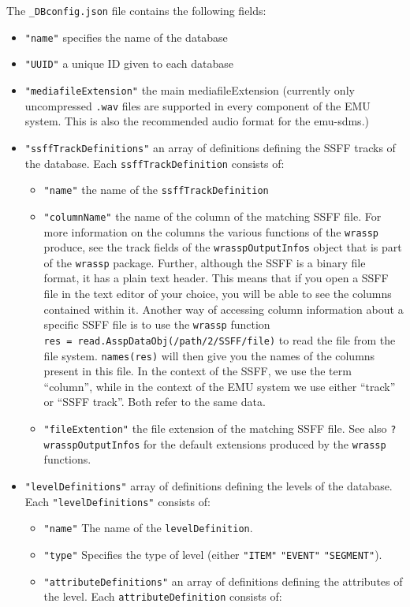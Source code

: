 \documentclass[]{book}
\begin{document}
The \texttt{\_DBconfig.json} file contains the following fields:

\begin{itemize}
\item
  \texttt{"name"} specifies the name of the database
\item
  \texttt{"UUID"} a unique ID given to each database
\item
  \texttt{"mediafileExtension"} the main mediafileExtension (currently only uncompressed \texttt{.wav} files are supported in every component of the EMU system. This is also the recommended audio format for the {emu-sdms}.)
\item
  \texttt{"ssffTrackDefinitions"} an array of definitions defining the SSFF tracks of the database. Each \texttt{ssffTrackDefinition} consists of:

  \begin{itemize}
  \item
    \texttt{"name"} the name of the \texttt{ssffTrackDefinition}
  \item
    \texttt{"columnName"} the name of the column of the matching SSFF file. For more information on the columns the various functions of the \texttt{wrassp} produce, see the track fields of the \texttt{wrasspOutputInfos} object that is part of the \texttt{wrassp} package. Further, although the SSFF is a binary file format, it has a plain text header. This means that if you open a SSFF file in the text editor of your choice, you will be able to see the columns contained within it. Another way of accessing column information about a specific SSFF file is to use the \texttt{wrassp} function \texttt{res~=~read.AsspDataObj(/path/2/SSFF/file)} to read the file from the file system. \texttt{names(res)} will then give you the names of the columns present in this file. In the context of the SSFF, we use the term ``column'', while in the context of the EMU system we use either ``track'' or ``SSFF track''. Both refer to the same data.
  \item
    \texttt{"fileExtention"} the file extension of the matching SSFF file. See also \texttt{?wrasspOutputInfos} for the default extensions produced by the \texttt{wrassp} functions.
  \end{itemize}
\item
  \texttt{"levelDefinitions"} array of definitions defining the levels of the database. Each \texttt{"levelDefinitions"} consists of:

  \begin{itemize}
  \item
    \texttt{"name"} The name of the \texttt{levelDefinition}.
  \item
    \texttt{"type"} Specifies the type of level (either \texttt{"ITEM"} \textbar{} \texttt{"EVENT"} \textbar{} \texttt{"SEGMENT"}).
  \item
    \texttt{"attributeDefinitions"} an array of definitions defining the
    attributes of the level. Each \texttt{attributeDefinition} consists of:


\end{itemize}
\end{itemize}
\end{document}
